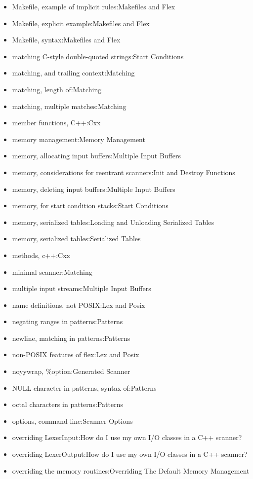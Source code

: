 \documentclass[openany,oneside]{book}
\begin{document}
\begin{itemize}
\item Makefile, example of implicit rules:Makefiles and Flex
\item Makefile, explicit example:Makefiles and Flex
\item Makefile, syntax:Makefiles and Flex
\item matching C-style double-quoted strings:Start Conditions
\item matching, and trailing context:Matching
\item matching, length of:Matching
\item matching, multiple matches:Matching
\item member functions, C++:Cxx
\item memory management:Memory Management
\item memory, allocating input buffers:Multiple Input Buffers
\item memory, considerations for reentrant scanners:Init and Destroy Functions
\item memory, deleting input buffers:Multiple Input Buffers
\item memory, for start condition stacks:Start Conditions
\item memory, serialized tables:Loading and Unloading Serialized Tables
\item memory, serialized tables:Serialized Tables
\item methods, c++:Cxx
\item minimal scanner:Matching
\item multiple input streams:Multiple Input Buffers
\item name definitions, not POSIX:Lex and Posix
\item negating ranges in patterns:Patterns
\item newline, matching in patterns:Patterns
\item non-POSIX features of flex:Lex and Posix
\item noyywrap, \%{}option:Generated Scanner
\item NULL character in patterns, syntax of:Patterns
\item octal characters in patterns:Patterns
\item options, command-line:Scanner Options
\item overriding LexerInput:How do I use my own I/O classes in a C++ scanner?
\item overriding LexerOutput:How do I use my own I/O classes in a C++ scanner?
\item overriding the memory routines:Overriding The Default Memory Management

\end{itemize}
\end{document}

